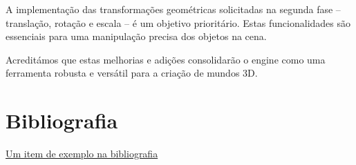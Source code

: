 \documentclass[12pt, a4paper]{article}
\begin{document}
A implementação das transformações geométricas solicitadas na segunda fase – translação, rotação e
escala – é um objetivo prioritário. Estas funcionalidades são essenciais para uma manipulação
precisa dos objetos na cena.

Acreditámos que estas melhorias e adições consolidarão o engine como uma ferramenta robusta e
versátil para a criação de mundos 3D.

\begingroup
\section{Bibliografia}
\renewcommand{\section}[2]{}

\begin{thebibliography}{9}
        \href{https://youtu.be/dQw4w9WgXcQ}{Um item de exemplo na bibliografia}
\end{thebibliography}
\endgroup
\end{document}
